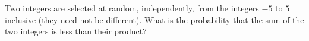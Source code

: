 Two integers are selected at random, independently, from the integers $-5$ to $5$ inclusive (they need not be different). What is the probability that the sum of the two integers is less than their product?
